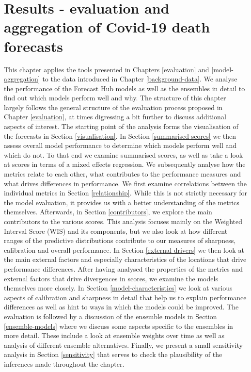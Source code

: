 \documentclass[
]{book}
\begin{document}
\hypertarget{results}{%
\chapter{Results - evaluation and aggregation of Covid-19 death forecasts}\label{results}}

This chapter applies the tools presented in Chapters \ref{evaluation} and \ref{model-aggregation} to the data introduced in Chapter \ref{background-data}. We analyse the performance of the Forecast Hub models as well as the ensembles in detail to find out which models perform well and why. The structure of this chapter largely follows the general structure of the evaluation process proposed in Chapter \ref{evaluation}, at times digressing a bit further to discuss additional aspects of interest. The starting point of the analysis forms the visualisation of the forecasts in Section \ref{visualisation}. In Section \ref{summarised-scores} we then assess overall model performance to determine which models perform well and which do not. To that end we examine summarised scores, as well as take a look at scores in terms of a mixed effects regression. We subsequently analyse how the metrics relate to each other, what contributes to the performance measures and what drives differences in performance. We first examine correlations between the individual metrics in Section \ref{relationship}. While this is not strictly necessary for the model evaluation, it provides us with a better understanding of the metrics themselves. Afterwards, in Section \ref{contributors}, we explore the main contributors to the various scores. This analysis focuses mainly on the Weighted Interval Score (WIS) and its components, but we also look at how different ranges of the predictive distributions contribute to our measures of sharpness, calibration and overall performance. In Section \ref{external-drivers} we then look at the main external factors and especially characteristics of the locations that drive performance differences. After having analysed the properties of the metrics and external factors that drive divergences in scores, we examine the models themselves more closely. In Section \ref{model-characteristics} we look at various aspects of calibration and sharpness in detail that help us to explain performance differences as well as hint to ways in which the models could be improved. The evaluation is followed by a discussion of the ensemble models in Section \ref{ensemble-models} where we discuss some aspects specific to the ensembles in more detail. These include a look at ensemble weights over time as well as analysis of different ensemble alternatives. Finally, we present a small sensitivity analysis in Section \ref{sensitivity} that serves to check the plausibility of the inferences made throughout the chapter.
\end{document}
